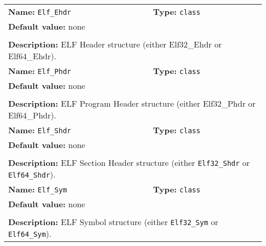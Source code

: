 \begin{center}
\begin{tabular}{|p{7.5cm}|p{7.5cm}|}
		\hline
		\multicolumn{1}{|p{7.5cm}}{\textbf{Name:} \texttt{Elf\_Ehdr}} & \multicolumn{1}{p{7.5cm}|}{\textbf{Type:} \texttt{class}}\\
		\multicolumn{2}{|p{15cm}|}{\textbf{Default value:} none}\\
		\multicolumn{2}{|l|}{}\\
		\multicolumn{2}{|p{15cm}|}{\textbf{Description:} \newline ELF Header structure (either Elf32\_Ehdr or Elf64\_Ehdr).}\\
		\hline
		\multicolumn{1}{|p{7.5cm}}{\textbf{Name:} \texttt{Elf\_Phdr}} & \multicolumn{1}{p{7.5cm}|}{\textbf{Type:} \texttt{class}}\\
		\multicolumn{2}{|p{15cm}|}{\textbf{Default value:} none}\\
		\multicolumn{2}{|l|}{}\\
		\multicolumn{2}{|p{15cm}|}{\textbf{Description:} \newline ELF Program Header structure (either Elf32\_Phdr or Elf64\_Phdr).}\\
		\hline
		\multicolumn{1}{|p{7.5cm}}{\textbf{Name:} \texttt{Elf\_Shdr}} & \multicolumn{1}{p{7.5cm}|}{\textbf{Type:} \texttt{class}}\\
		\multicolumn{2}{|p{15cm}|}{\textbf{Default value:} none}\\
		\multicolumn{2}{|l|}{}\\
		\multicolumn{2}{|p{15cm}|}{\textbf{Description:} \newline ELF Section Header structure (either \texttt{Elf32\_Shdr} or \texttt{Elf64\_Shdr}).}\\
		\hline
		\multicolumn{1}{|p{7.5cm}}{\textbf{Name:} \texttt{Elf\_Sym}} & \multicolumn{1}{p{7.5cm}|}{\textbf{Type:} \texttt{class}}\\
		\multicolumn{2}{|p{15cm}|}{\textbf{Default value:} none}\\
		\multicolumn{2}{|l|}{}\\
		\multicolumn{2}{|p{15cm}|}{\textbf{Description:} \newline ELF Symbol structure (either \texttt{Elf32\_Sym} or \texttt{Elf64\_Sym}).}\\
		\hline
	\end{tabular}
\end{center}

